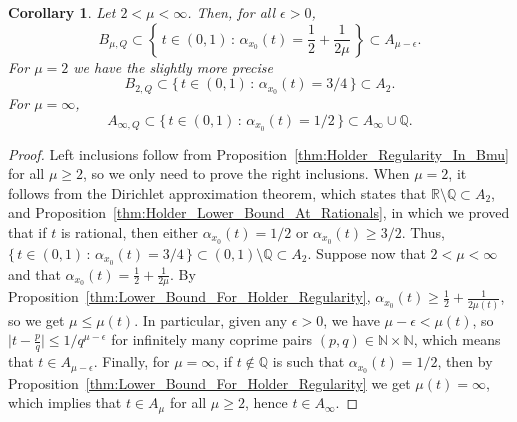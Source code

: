 \documentclass[11pt,reqno]{amsart}
\newtheorem{cor}[thm]{Corollary}
\theoremstyle{definition}
\begin{document}
\begin{cor}\label{thm:Sandwich_Sets}
Let $2 < \mu < \infty$. Then, for all $\epsilon > 0$, 
\begin{equation}
 B_{\mu,Q} \subset  \left\{ \, t \in (0,1) \, : \, \alpha_{x_0}(t) = \frac12 + \frac{1}{2\mu}  \,  \right\} \subset A_{\mu - \epsilon}. 
\end{equation}
For $\mu = 2$ we have the slightly more precise
\begin{equation}
 B_{2,Q} \subset  \{ \, t \in (0,1) \, : \, \alpha_{x_0}(t) =  3/4 \,  \}  \subset A_2.
\end{equation}
For $\mu = \infty$, 
\begin{equation}
 A_{\infty,Q} \subset  \{ \, t \in (0,1) \, : \, \alpha_{x_0}(t) =  1/2  \,  \}  \subset A_\infty \cup \mathbb Q.
\end{equation}
\end{cor}
\begin{proof}
Left inclusions follow from Proposition~\ref{thm:Holder_Regularity_In_Bmu} for all $\mu \geq 2$, so we only need to prove the right inclusions. 
When $\mu = 2$, it follows from the Dirichlet approximation theorem, which states that $\mathbb R \setminus \mathbb Q \subset A_2$, 
and Proposition~\ref{thm:Holder_Lower_Bound_At_Rationals}, in which we proved that if $t$ is rational, then either $\alpha_{x_0}(t) = 1/2$ or $\alpha_{x_0}(t) \geq 3/2$. 
Thus,  $\{ \, t \in (0,1) \, : \, \alpha_{x_0}(t) =  3/4 \,  \}  \subset (0,1) \setminus \mathbb Q \subset A_2$. 
Suppose now that $2 < \mu < \infty$ and that $\alpha_{x_0}(t) = \frac12 + \frac{1}{2\mu}$.
By Proposition~\ref{thm:Lower_Bound_For_Holder_Regularity}, $\alpha_{x_0}(t) \geq \frac12 + \frac{1}{2\mu(t)}$, so we get
$\mu \leq \mu(t)$.
In particular, given any $\epsilon > 0$, we have $\mu - \epsilon < \mu(t)$, so  
$ \big| t - \frac{p}{q} \big| \leq 1/q^{\mu - \epsilon}$ 
for infinitely many coprime pairs $ (p,q) \in \mathbb N \times \mathbb N$, 
which means that $t \in A_{\mu - \epsilon}$. 
Finally, for $\mu = \infty$, if $t \not\in \mathbb Q$ is such that $\alpha_{x_0}(t) = 1/2$, then by Proposition~\ref{thm:Lower_Bound_For_Holder_Regularity} we get $\mu(t) = \infty$, 
which implies that $t \in A_\mu$ for all $\mu \geq 2$, hence $t \in A_\infty$. 
\end{proof}
\end{document}
